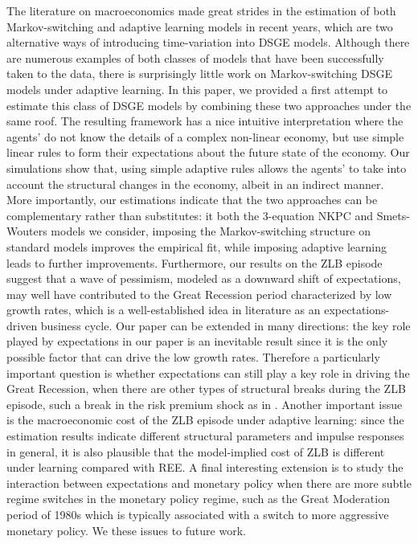 \documentclass[12pt,reqno]{article}
\numberwithin{equation}{section}
\begin{document}
The literature on macroeconomics made great strides in the estimation of both Markov-switching and adaptive learning models in recent years, which are two alternative ways of introducing time-variation into DSGE models. Although there are numerous examples of both classes of models that have been successfully taken to the data, there is surprisingly little work on Markov-switching DSGE models under adaptive learning. In this paper, we provided a first attempt to estimate this class of DSGE models by combining these two approaches under the same roof. The resulting framework has a nice intuitive interpretation where the agents’ do not know the details of a complex non-linear economy, but use simple linear rules to form their expectations about the future state of the economy. Our simulations show that, using simple adaptive rules allows the agents’ to take into account the structural changes in the economy, albeit in an indirect manner. More importantly, our estimations indicate that the two approaches can be complementary rather than substitutes: it both the 3-equation NKPC and Smets-Wouters models we consider, imposing the Markov-switching structure on standard models improves the empirical fit, while imposing adaptive learning leads to further improvements. Furthermore, our results on the ZLB episode suggest that a wave of pessimism, modeled as a downward shift of expectations, may well have contributed to the Great Recession period characterized by low growth rates, which is a well-established idea in literature as an expectations-driven business cycle. Our paper can be extended in many directions: the key role played by expectations in our paper is an inevitable result since it is the only possible factor that can drive the low growth rates. Therefore a particularly important question is whether expectations can still play a key role in driving the Great Recession, when there are other types of structural breaks during the ZLB episode, such a break in the risk premium shock as in \cite{linde2017estimation}. Another important issue is the macroeconomic cost of the ZLB episode under adaptive learning: since the estimation results indicate different structural parameters and impulse responses in general, it is also plausible that the model-implied cost of ZLB is different under learning compared with REE. A final interesting extension is to study the interaction between expectations and monetary policy  when there are more subtle regime switches in the monetary policy regime, such as the Great Moderation period of 1980s which is typically associated with a switch to more aggressive monetary policy. We these issues to future work. 



\end{document}
